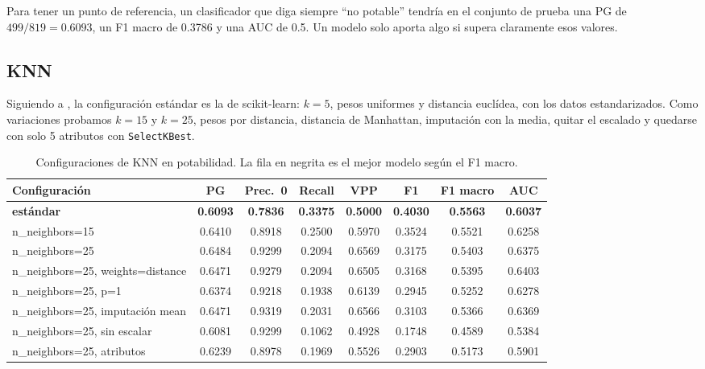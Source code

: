 \documentclass[11pt,a4paper]{article}
\let\citetOriginal\citet
\renewcommand*{\citet}[1]{\textbf{\citetOriginal{#1}}}%
\begin{document}
Para tener un punto de referencia, un clasificador que diga siempre ``no potable'' tendría en el conjunto de prueba una PG de $499/819=0.6093$, un F1 macro de 0.3786 y una AUC de 0.5. Un modelo solo aporta algo si supera claramente esos valores.

\subsection{KNN}
Siguiendo a \citet{cover1967}, la configuración estándar es la de scikit-learn: $k=5$, pesos uniformes y distancia euclídea, con los datos estandarizados. Como variaciones probamos $k=15$ y $k=25$, pesos por distancia, distancia de Manhattan, imputación con la media, quitar el escalado y quedarse con solo 5 atributos con \texttt{SelectKBest}.

\begin{table}[H]
\centering
\small
\caption{Configuraciones de KNN en potabilidad. La fila en negrita es el mejor modelo según el F1 macro.}
\setlength{\tabcolsep}{4pt}
\begin{tabular}{>{\raggedright\arraybackslash}p{4.9cm}ccccccc}
\toprule
Configuración & PG & Prec.\ 0 & Recall & VPP & F1 & F1 macro & AUC \\
\midrule
\textbf{estándar} & \textbf{0.6093} & \textbf{0.7836} & \textbf{0.3375} & \textbf{0.5000} & \textbf{0.4030} & \textbf{0.5563} & \textbf{0.6037} \\
n\_neighbors=\allowbreak{}15 & 0.6410 & 0.8918 & 0.2500 & 0.5970 & 0.3524 & 0.5521 & 0.6258 \\
n\_neighbors=\allowbreak{}25 & 0.6484 & 0.9299 & 0.2094 & 0.6569 & 0.3175 & 0.5403 & 0.6375 \\
n\_neighbors=\allowbreak{}25, \allowbreak weights=\allowbreak{}distance & 0.6471 & 0.9279 & 0.2094 & 0.6505 & 0.3168 & 0.5395 & 0.6403 \\
n\_neighbors=\allowbreak{}25, \allowbreak p=\allowbreak{}1 & 0.6374 & 0.9218 & 0.1938 & 0.6139 & 0.2945 & 0.5252 & 0.6278 \\
n\_neighbors=\allowbreak{}25, \allowbreak imputación mean & 0.6471 & 0.9319 & 0.2031 & 0.6566 & 0.3103 & 0.5366 & 0.6369 \\
n\_neighbors=\allowbreak{}25, \allowbreak sin escalar & 0.6081 & 0.9299 & 0.1062 & 0.4928 & 0.1748 & 0.4589 & 0.5384 \\
n\_neighbors=\allowbreak{}25, \allowbreak 5 atributos & 0.6239 & 0.8978 & 0.1969 & 0.5526 & 0.2903 & 0.5173 & 0.5901 \\
\bottomrule
\end{tabular}
\end{table}
\end{document}
